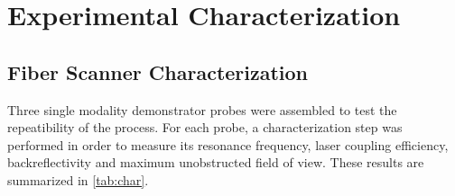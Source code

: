 %
%
\chapter{Experimental Characterization}
\label{Ch:Measurements}	



\section{Fiber Scanner Characterization}

Three single modality demonstrator probes were assembled to test the repeatibility of the process.  For each probe, a characterization step was performed in order to measure its resonance frequency, laser coupling efficiency, backreflectivity and maximum unobstructed field of view. These results are summarized in \autoref{tab:char}.

